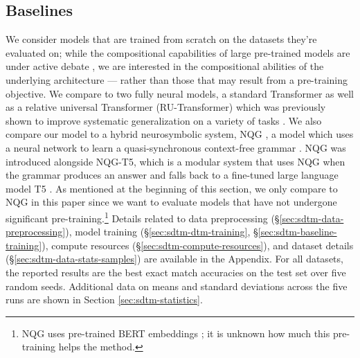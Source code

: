 \subsection{Baselines}
We consider models that are trained from scratch on the datasets they're evaluated on; while the compositional capabilities of large pre-trained models are under active debate \citep{kim2022uncontrolled}, we are interested in the compositional abilities of the underlying architecture --- rather than those that may result from a pre-training objective.
We compare \sdtm to two fully neural models, a standard Transformer \citep{vaswani2017attention} as well as a relative universal Transformer (RU-Transformer) which was previously shown to improve systematic generalization on a variety of tasks \citep{csordas-etal-2021-devil}. We also compare our model to a hybrid neurosymbolic system, NQG \citep{shaw-etal-2021-compositional, Sun_2023_ReplicationStudyCompositional}, a model which uses a neural network to learn a quasi-synchronous context-free grammar \citep{smith-eisner-2006-quasi}. NQG was introduced alongside NQG-T5, which is a modular system that uses NQG when the grammar produces an answer and falls back to a fine-tuned large language model T5 \citep{t5}. As mentioned at the beginning of this section, we only compare to NQG in this paper since we want to evaluate models that have not undergone significant pre-training.\footnote{NQG uses pre-trained BERT embeddings \citep{devlin_bert_2019}; it is unknown how much this pre-training helps the method.} Details related to data preprocessing (\S\ref{sec:sdtm-data-preprocessing}), model training (\S\ref{sec:sdtm-dtm-training}, \S\ref{sec:sdtm-baseline-training}), compute resources (\S\ref{sec:sdtm-compute-resources}), and dataset details (\S\ref{sec:sdtm-data-stats-samples}) are available in the Appendix. For all datasets, the reported results are the best exact match accuracies on the test set over five random seeds. Additional data on means and standard deviations across the five runs are shown in Section \ref{sec:sdtm-statistics}.


